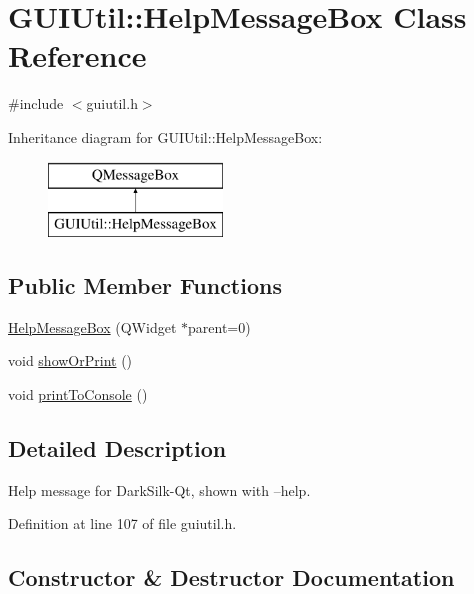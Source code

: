 \hypertarget{class_g_u_i_util_1_1_help_message_box}{}\section{G\+U\+I\+Util\+:\+:Help\+Message\+Box Class Reference}
\label{class_g_u_i_util_1_1_help_message_box}


{\ttfamily \#include $<$guiutil.\+h$>$}

Inheritance diagram for G\+U\+I\+Util\+:\+:Help\+Message\+Box\+:\begin{figure}[H]
\begin{center}
\leavevmode
\includegraphics[height=2.000000cm]{class_g_u_i_util_1_1_help_message_box}
\end{center}
\end{figure}
\subsection*{Public Member Functions}
\begin{DoxyCompactItemize}
\item 
\hyperlink{class_g_u_i_util_1_1_help_message_box_af8c3ad315224552b1699ac34c7ebd839}{Help\+Message\+Box} (Q\+Widget $\ast$parent=0)
\item 
void \hyperlink{class_g_u_i_util_1_1_help_message_box_a6302786b8f88ca0980047262940b144e}{show\+Or\+Print} ()
\item 
void \hyperlink{class_g_u_i_util_1_1_help_message_box_afbd5a1cd2e1e43e807fda73d6e3d69e5}{print\+To\+Console} ()
\end{DoxyCompactItemize}


\subsection{Detailed Description}
Help message for Dark\+Silk-\/\+Qt, shown with --help. 

Definition at line 107 of file guiutil.\+h.



\subsection{Constructor \& Destructor Documentation}
\hypertarget{class_g_u_i_util_1_1_help_message_box_af8c3ad315224552b1699ac34c7ebd839}{}
